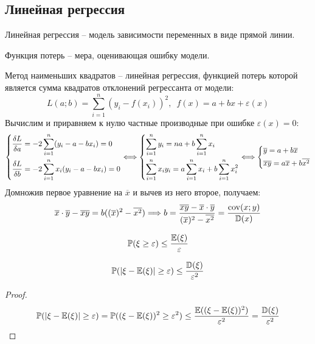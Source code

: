 \documentclass[12pt]{article}
\begin{document}
\subsection{Линейная регрессия}

\begin{definition}
    Линейная регрессия -- модель зависимости переменных в виде прямой линии.
\end{definition}
\begin{definition}
    Функция потерь -- мера, оценивающая ошибку модели.
\end{definition}
\begin{definition}
    Метод наименьших квадратов -- линейная регрессия, функцией потерь которой является сумма квадратов отклонений регрессанта от модели:
    $$L(a;b)=\sum_{i=1}^n(y_i-f(x_i))^2,\enspace f(x)=a+bx+\varepsilon(x)$$
    Вычислим и приравняем к нулю частные производные при ошибке $\varepsilon(x)=0$:
    $$\begin{dcases}
        \dfrac{\delta L}{\delta a}=-2\sum_{i=1}^{n}(y_i-a-bx_i)=0\\
        \dfrac{\delta L}{\delta b}=-2\sum_{i=1}^{n}x_i(y_i-a-bx_i)=0
    \end{dcases}\Longleftrightarrow\begin{dcases}
        \sum_{i=1}^{n}y_i=na+b\sum_{i=1}^{n}x_i\\
        \sum_{i=1}^{n}x_iy_i=a\sum_{i=1}^{n}x_i+b\sum_{i=1}^{n}x_i^2
    \end{dcases}\Longleftrightarrow\begin{dcases}
        \overline{y}=a+b\overline{x}\\
        \overline{xy}=a\overline{x}+b\overline{x^2}
    \end{dcases}$$
    Домножив первое уравнение на $\overline{x}$ и вычев из него второе, получаем:
    $$\overline{x}\cdot\overline{y}-\overline{xy}=b((\overline{x})^2-\overline{x^2})\Longrightarrow b=\frac{\overline{xy}-\overline{x}\cdot\overline{y}}{(\overline{x})^2-\overline{x^2}}=\frac{\operatorname{cov}(x;y)}{\mathbb{D}(x)}$$
\end{definition}
\begin{theorem}
    $$\mathbb{P}(\xi\geq\varepsilon)\leq\frac{\mathbb{E}(\xi)}{\varepsilon}$$
\end{theorem}
\begin{theorem}
    $$\mathbb{P}(|\xi-\mathbb{E}(\xi)|\geq\varepsilon)\leq\frac{\mathbb{D}(\xi)}{\varepsilon^2}$$
\end{theorem}
\begin{proof}
    $$\mathbb{P}(|\xi-\mathbb{E}(\xi)|\geq\varepsilon)=\mathbb{P}((\xi-\mathbb{E}(\xi))^2\geq\varepsilon^2)\leq\frac{\mathbb{E}((\xi-\mathbb{E}(\xi))^2)}{\varepsilon^2}=\frac{\mathbb{D}(\xi)}{\varepsilon^2}$$
\end{proof}
\end{document}
